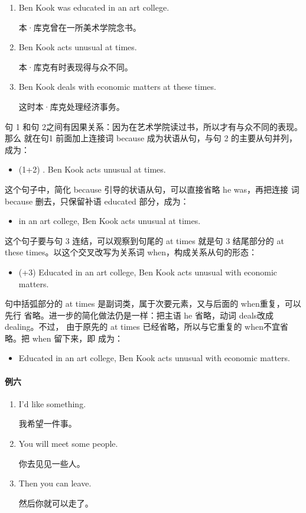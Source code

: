 \begin{enumerate}
\item Ben Kook was educated in an art college.

  本·库克曾在一所美术学院念书。
\item Ben Kook acts unusual at times.

  本·库克有时表现得与众不同。
\item Ben Kook deals with economic matters at these times.

  这时本·库克处理经济事务。
\end{enumerate}

句 1 和句 2之间有因果关系：因为在艺术学院读过书，所以才有与众不同的表现。那么
就在句1 前面加上连接词 because 成为状语从句，与句 2 的主要从句并列，成为：
\begin{itemize}
\item (1+2) . Ben Kook acts unusual at
  times.
\end{itemize}
这个句子中，简化 because 引导的状语从句，可以直接省略 he was，再把连接
词because 删去，只保留补语 educated 部分，成为：
\begin{itemize}
\item {} in an art college, Ben Kook acts unusual at times.
\end{itemize}
这个句子要与句 3 连结，可以观察到句尾的 at times 就是句 3 结尾部分的 at
these times。以这个交叉改写为关系词 when，构成关系从句的形态：
\begin{itemize}
\item (+3) Educated in an art college, Ben Kook acts unusual  with economic matters.
\end{itemize}
句中括弧部分的 at times 是副词类，属于次要元素，又与后面的 when重复，可以先行
省略。进一步的简化做法仍是一样：把主语 he 省略，动词 deals改成 dealing。不过，
由于原先的 at times 已经省略，所以与它重复的 when不宜省略。把 when 留下来，即
成为：

\begin{itemize}
\item Educated in an art college, Ben Kook acts unusual  with
  economic matters.
\end{itemize}

\paragraph{例六}

\begin{enumerate}
\item   I'd like something.

  我希望一件事。
\item   You will meet some people.

  你去见见一些人。
\item   Then you can leave.

  然后你就可以走了。
\end{enumerate}


